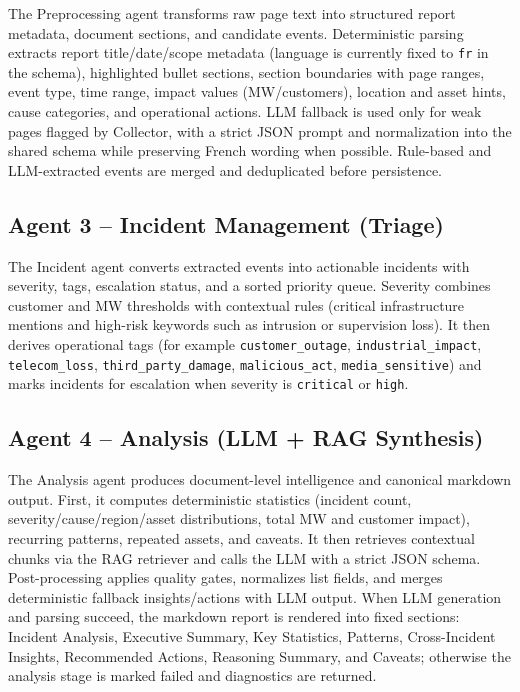 \documentclass[11pt,a4paper]{article}
\begin{document}
The Preprocessing agent transforms raw page text into structured report metadata, document sections, and candidate events. Deterministic parsing extracts report title/date/scope metadata (language is currently fixed to \texttt{fr} in the schema), highlighted bullet sections, section boundaries with page ranges, event type, time range, impact values (MW/customers), location and asset hints, cause categories, and operational actions. LLM fallback is used only for weak pages flagged by Collector, with a strict JSON prompt and normalization into the shared schema while preserving French wording when possible. Rule-based and LLM-extracted events are merged and deduplicated before persistence.

\subsection{Agent 3 -- Incident Management (Triage)}

The Incident agent converts extracted events into actionable incidents with severity, tags, escalation status, and a sorted priority queue. Severity combines customer and MW thresholds with contextual rules (critical infrastructure mentions and high-risk keywords such as intrusion or supervision loss). It then derives operational tags (for example \texttt{customer\_outage}, \texttt{industrial\_impact}, \texttt{telecom\_loss}, \texttt{third\_party\_damage}, \texttt{malicious\_act}, \texttt{media\_sensitive}) and marks incidents for escalation when severity is \texttt{critical} or \texttt{high}.

\subsection{Agent 4 -- Analysis (LLM + RAG Synthesis)}

The Analysis agent produces document-level intelligence and canonical markdown output. First, it computes deterministic statistics (incident count, severity/cause/region/asset distributions, total MW and customer impact), recurring patterns, repeated assets, and caveats. It then retrieves contextual chunks via the RAG retriever and calls the LLM with a strict JSON schema. Post-processing applies quality gates, normalizes list fields, and merges deterministic fallback insights/actions with LLM output. When LLM generation and parsing succeed, the markdown report is rendered into fixed sections: Incident Analysis, Executive Summary, Key Statistics, Patterns, Cross-Incident Insights, Recommended Actions, Reasoning Summary, and Caveats; otherwise the analysis stage is marked failed and diagnostics are returned.
\end{document}
